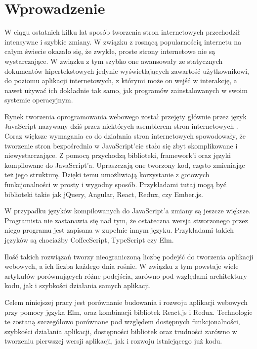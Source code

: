 \chapter{Wprowadzenie} \label{chap:wprowadzenie}

W ciągu ostatnich kilku lat sposób tworzenia stron internetowych przechodził intensywne i szybkie zmiany. W związku z rosnącą popularnością internetu na całym świecie okazało się, że zwykłe, proste strony internetowe nie są wystarczające. W związku z tym szybko one awansowały ze statycznych dokumentów hipertekstowych jedynie wyświetlających zawartość użytkownikowi, do poziomu aplikacji internetowych, z którymi może on wejść w interakcję, a nawet używać ich dokładnie tak samo, jak programów zainstalowanych w swoim systemie operacyjnym. 

Rynek tworzenia oprogramowania webowego został przejęty głównie przez język JavaScript nazywany dziś przez niektórych asemblerem stron internetowych \cite{JSAssembly}. Coraz większe wymagania co do działania stron internetowych spowodowały, że tworzenie stron bezpośrednio w JavaScript'cie stało się zbyt skomplikowane i niewystarczające. Z pomocą przychodzą biblioteki, framework'i oraz języki kompilowane do JavaScript'a. Upraszczają one tworzony kod, często zmieniając też jego strukturę. Dzięki temu umożliwiają korzystanie z gotowych funkcjonalności w prosty i wygodny sposób. Przykładami tutaj mogą być biblioteki takie jak jQuery, Angular, React, Redux, czy Ember.js. 

W przypadku języków kompilowanych do JavaScript'a zmiany są jeszcze większe. Programista nie zastanawia się nad tym, że ostateczna wersja stworzonego przez niego programu jest zapisana w zupełnie innym języku. Przykładami takich języków są chociażby CoffeeScript, TypeScript czy Elm.

Ilość takich rozwiązań tworzy nieograniczoną liczbę podejść do tworzenia aplikacji webowych, a ich liczba każdego dnia rośnie. W związku z tym powstaje wiele artykułów porównujących różne podejścia, zarówno pod względami architektury kodu, jak i szybkości działania samych aplikacji.

Celem niniejszej pracy jest porównanie budowania i rozwoju aplikacji webowych przy pomocy języka Elm, oraz kombinacji bibliotek React.js i Redux. Technologie te zostaną szczegółowo porównane pod względem dostępnych funkcjonalności, szybkości działania aplikacji, dostępności bibliotek oraz trudności zarówno w tworzeniu pierwszej wersji aplikacji, jak i rozwoju istniejącego już kodu.

